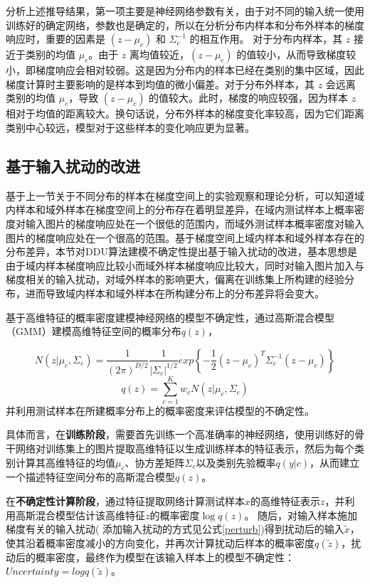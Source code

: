 分析上述推导结果，第一项主要是神经网络参数有关，由于对不同的输入统一使用训练好的确定网络，参数也是确定的，所以在分析分布内样本和分布外样本的梯度响应时，重要的因素是 \( (z - \mu_c) \) 和 \( \Sigma_c^{-1} \) 的相互作用。 对于分布内样本，其 \( z \) 接近于类别的均值 \( \mu_c \)。由于 \( z \) 离均值较近，\( (z - \mu_c) \) 的值较小，从而导致梯度较小，即梯度响应会相对较弱。这是因为分布内的样本已经在类别的集中区域，因此梯度计算时主要影响的是样本到均值的微小偏差。对于分布外样本，其 \( z \) 会远离类别的均值 \( \mu_c \)，导致 \( (z - \mu_c) \) 的值较大。此时，梯度的响应较强，因为样本 \( z \) 相对于均值的距离较大。换句话说，分布外样本的梯度变化率较高，因为它们距离类别中心较远，模型对于这些样本的变化响应更为显著。


\subsection{基于输入扰动的改进}
基于上一节关于不同分布的样本在梯度空间上的实验观察和理论分析，可以知道域内样本和域外样本在梯度空间上的分布存在着明显差异，在域内测试样本上概率密度对输入图片的梯度响应处在一个很低的范围内，而域外测试样本概率密度对输入图片的梯度响应处在一个很高的范围。基于梯度空间上域内样本和域外样本存在的分布差异，本节对DDU算法建模不确定性提出基于输入扰动的改进，基本思想是由于域内样本梯度响应比较小而域外样本梯度响应比较大，同时对输入图片加入与梯度相关的输入扰动，对域外样本的影响更大，偏离在训练集上所构建的经验分布，进而导致域内样本和域外样本在所构建分布上的分布差异将会变大。

基于高维特征的概率密度建模神经网络的模型不确定性，通过高斯混合模型（GMM）建模高维特征空间的概率分布$q(z)$，

\begin{equation}
N(z|\mu_c,\Sigma_c)=\frac{1}{(2\pi)^{D/2}}\frac{1}{\left| \Sigma_c \right|^{1/2}}exp\left\{-\frac{1}{2}(z-\mu_c)^T\Sigma_c^{-1}(z-\mu_c)\right\}
\end{equation}
\begin{equation}
    q(z)  = \sum_{c=1}^{K}w_cN(z|\mu_c,\Sigma_c)
\end{equation}
并利用测试样本在所建概率分布上的概率密度来评估模型的不确定性。

具体而言，在\textbf{训练阶段}，需要首先训练一个高准确率的神经网络，使用训练好的骨干网络对训练集上的图片提取高维特征以生成训练样本的特征表示，然后为每个类别计算其高维特征的均值$\mu_c$、协方差矩阵$\Sigma_c$以及类别先验概率$q(y|c)$，从而建立一个描述特征空间分布的高斯混合模型$q(z)$。

在\textbf{不确定性计算阶段}，通过特征提取网络计算测试样本$x$的高维特征表示$z$，并利用高斯混合模型估计该高维特征$z$的概率密度$\log q(z)$。 随后，对输入样本施加梯度有关的输入扰动(
添加输入扰动的方式见公式\ref{perturb})得到扰动后的输入$\tilde{x}$，使其沿着概率密度减小的方向变化，并再次计算扰动后样本的概率密度$q(\tilde{z})$，扰动后的概率密度，最终作为模型在该输入样本上的模型不确定性：$Uncertainty = logq(\tilde{z})$。

